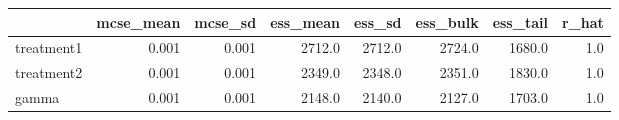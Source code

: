 \begin{tabular}{lrrrrrrr}
\toprule
{} &  mcse\_mean &  mcse\_sd &  ess\_mean &  ess\_sd &  ess\_bulk &  ess\_tail &  r\_hat \\
\midrule
treatment1 &      0.001 &    0.001 &    2712.0 &  2712.0 &    2724.0 &    1680.0 &    1.0 \\
treatment2 &      0.001 &    0.001 &    2349.0 &  2348.0 &    2351.0 &    1830.0 &    1.0 \\
gamma      &      0.001 &    0.001 &    2148.0 &  2140.0 &    2127.0 &    1703.0 &    1.0 \\
\bottomrule
\end{tabular}
